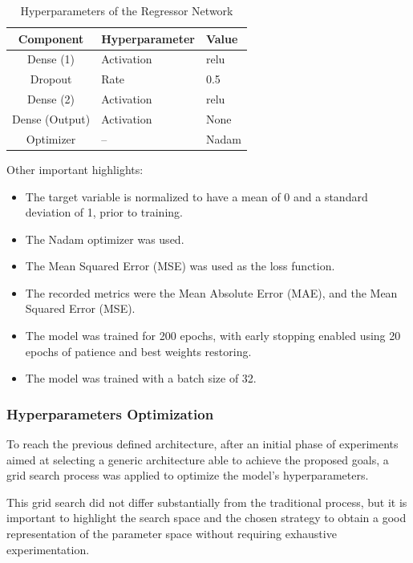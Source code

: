 \documentclass[sigconf,natbib=false]{acmart}
\begin{document}
\begin{table} \small
  \caption{Hyperparameters of the Regressor Network}
  \label{tab:hyperparams_regressor}
  \begin{tabular}{cll}
    \toprule
    Component & Hyperparameter & Value \\
    \midrule
    \multirow{1}{*}{Dense (1)} 
        & Activation & relu \\
    Dropout & Rate & 0.5 \\
    \multirow{1}{*}{Dense (2)} 
        & Activation & relu \\
    \multirow{1}{*}{Dense (Output)} 
        & Activation & None \\
    Optimizer & -- & Nadam \\
    \bottomrule
  \end{tabular}
\end{table}

Other important highlights:

\begin{itemize}
    \item The target variable is normalized to have a mean of 0 and a standard deviation of 1, prior to training.
    \item The Nadam optimizer was used.
    \item The Mean Squared Error (MSE) was used as the loss function.
    \item The recorded metrics were the Mean Absolute Error (MAE), and the Mean Squared Error (MSE).
    \item The model was trained for 200 epochs, with early stopping enabled using 20 epochs of patience and best weights restoring.
    \item The model was trained with a batch size of 32.
\end{itemize}

\subsubsection{Hyperparameters Optimization}

To reach the previous defined architecture, after an initial phase of experiments aimed at selecting a generic architecture able to achieve the proposed goals, a grid search process was applied to optimize the model’s hyperparameters.

This grid search did not differ substantially from the traditional process, but it is important to highlight the search space and the chosen strategy to obtain a good representation of the parameter space without requiring exhaustive experimentation.
\end{document}

